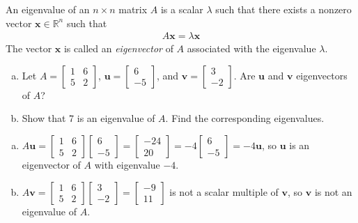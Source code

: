 \documentclass[12pt,letterpaper,reqno]{article}
\numberwithin{equation}{section}
\newcommand{\bv}{\mathbf{v}}
\newcommand{\bu}{\mathbf{u}}
\newcommand{\bx}{\mathbf{x}}
\begin{document}
\begin{defn}
An eigenvalue of an $n\times n$ matrix $A$ is a scalar $\lambda$ such that there exists a nonzero vector $\bx \in \mathbb{R}^n$ such that 
\begin{align*}
	A\bx=\lambda\bx
\end{align*}
The vector $\bx$ is called an \emph{eigenvector} of $A$ associated with the eigenvalue $\lambda$.	
\end{defn}

\begin{exercise}
\begin{enumerate}[(a)]
	\item Let $A=\begin{bmatrix}
	1 & 6 \\
	5 & 2
\end{bmatrix}$, $\bu=\begin{bmatrix}
	6 \\ -5
\end{bmatrix}$, and $\bv=\begin{bmatrix}
	3 \\ -2
\end{bmatrix}$. Are $\bu$ and $\bv$ eigenvectors of $A$?
	\item Show that 7 is an eigenvalue of $A$. Find the corresponding eigenvalues.
\end{enumerate}	
\end{exercise}

{\color{red}
\begin{solution}
	\begin{enumerate}[(a)]
		\item $A\bu=\begin{bmatrix}
			1 & 6 \\
			5 & 2
		\end{bmatrix}\begin{bmatrix}
			6 \\ -5
		\end{bmatrix}=\begin{bmatrix}
			-24 \\ 20
		\end{bmatrix}=-4\begin{bmatrix}
			6 \\ -5
		\end{bmatrix}=-4\bu$, so $\bu$ is an eigenvector of $A$ with eigenvalue $-4$.
		\item $A\bv=\begin{bmatrix}
			1 & 6 \\
			5 & 2
		\end{bmatrix}\begin{bmatrix}
			3 \\ -2
		\end{bmatrix}=\begin{bmatrix}
			-9 \\ 11
		\end{bmatrix}$ is not a scalar multiple of $\bv$, so $\bv$ is not an eigenvalue of $A$.
	\end{enumerate}
\end{solution}}
\end{document}
